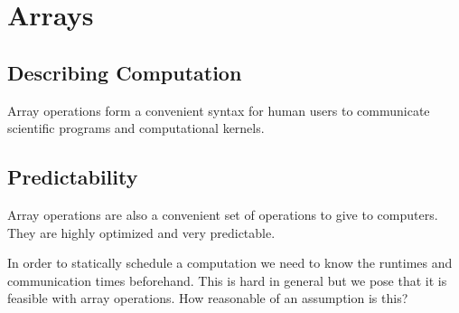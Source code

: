 \section{Arrays}

\subsection{Describing Computation}

Array operations form a convenient syntax for human users to communicate scientific programs and computational kernels. 

\subsection{Predictability}

Array operations are also a convenient set of operations to give to
computers. They are highly optimized and very predictable. 

In order to statically schedule a computation we need to know the runtimes and
communication times beforehand. This is hard in general but we pose that it is
feasible with array operations. How reasonable of an assumption is this? 
